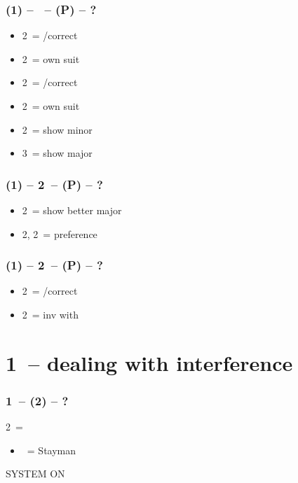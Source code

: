 \subsubsection*{(1\ntx) -- \dbl\ -- (P) -- ?}
\begin{itemize}
    \item 2\clubs\ = \pass/correct
    \item 2\diams\ = own suit
    \item 2\hearts\ = \pass/correct
    \item 2\spades\ = own suit
    \item 2\nt\ = show minor
    \item 3\diams\ = show major
\end{itemize}

\subsubsection*{(1\ntx) -- 2\clubs\ -- (P) -- ?}
\begin{itemize}
    \item 2\diams\ = show better major
    \item 2\hearts, 2\spades\ = preference
\end{itemize}

\subsubsection*{(1\ntx) -- 2\diams\ -- (P) -- ?}
\begin{itemize}
    \item 2\hearts\ = \pass/correct
    \item 2\spades\ = inv with \hearts
\end{itemize}

\section{\texorpdfstring{1\ntx\ -- dealing with interference}{1ntInterference}}\label{sec:1ntInterference}

\subsubsection*{1\ntx\ -- (2\clubs) -- ?}
2\clubs\ = \clubs
\begin{itemize}
    \item \dbl\ = Stayman
\end{itemize}

SYSTEM ON

